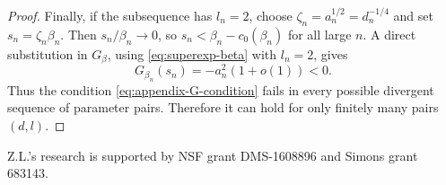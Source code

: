 \documentclass[11pt]{amsart}
\theoremstyle{plain}
\numberwithin{equation}{section}
\numberwithin{theorem}{section}
\numberwithin{figure}{section}
\begin{document}
\begin{proof}
Finally, if the subsequence has \(l_n=2\), choose
\(\zeta_n=a_n^{1/2}=d_n^{-1/4}\) and set \(s_n=\zeta_n\beta_n\).  Then
\(s_n/\beta_n\to0\), so \(s_n<\beta_n-c_0(\beta_n)\) for all large \(n\).  A direct
substitution in \(G_\beta\), using \eqref{eq:superexp-beta} with \(l_n=2\), gives
\begin{equation}
  G_{\beta_n}(s_n)=-a_n^2(1+o(1))<0.
\label{eq:G-superexp-l2}
\end{equation}
Thus the condition \eqref{eq:appendix-G-condition} fails in every possible divergent
sequence of parameter pairs.  Therefore it can hold for only finitely many pairs
\((d,l)\).
\end{proof}


\bigskip
\bigskip

 Z.L.'s research is supported by NSF grant DMS-1608896 and Simons grant 683143.




\end{document}
